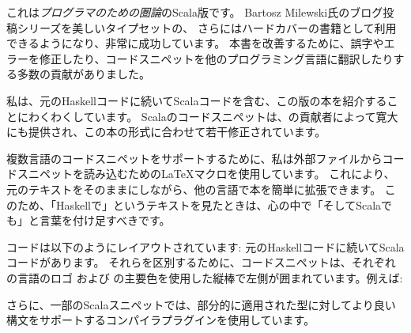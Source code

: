 
\lettrine[lhang=0.17]{こ}{れは}\emph{プログラマのための圏論}のScala版です。
Bartosz Milewski氏のブログ投稿シリーズを美しいタイプセットの、
さらにはハードカバーの書籍として利用できるようになり、非常に成功しています。
本書を改善するために、誤字やエラーを修正したり、コードスニペットを他のプログラミング言語に翻訳したりする多数の貢献がありました。

私は、元のHaskellコードに続いてScalaコードを含む、この版の本を紹介することにわくわくしています。
Scalaのコードスニペットは、の貢献者によって寛大にも提供され、この本の形式に合わせて若干修正されています。

複数言語のコードスニペットをサポートするために、私は外部ファイルからコードスニペットを読み込むための\LaTeX{}マクロを使用しています。
これにより、元のテキストをそのままにしながら、他の言語で本を簡単に拡張できます。
このため、「Haskellで」というテキストを見たときは、心の中で「そしてScalaでも」と言葉を付け足すべきです。

コードは以下のようにレイアウトされています: 元のHaskellコードに続いてScalaコードがあります。
それらを区別するために、コードスニペットは、それぞれの言語のロゴ  および  の主要色を使用した縦棒で左側が囲まれています。例えば: 

\unskip
{}
\NoIndentAfterThis
さらに、一部のScalaスニペットでは、部分的に適用された型に対してより良い構文をサポートするコンパイラプラグインを使用しています。
